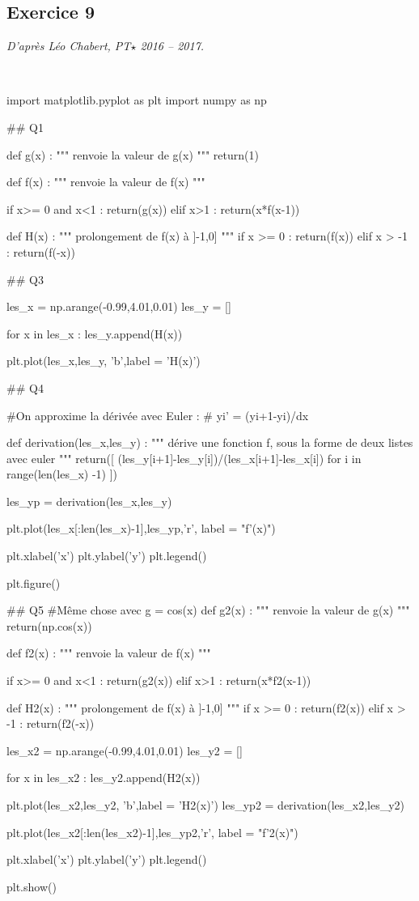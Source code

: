\documentclass[10pt,fleqn]{article} %
\begin{document}
\subsection*{Exercice 9}
\textit{D'après Léo Chabert, PT$\star$ 2016 -- 2017.}
\begin{corrige}
$\quad$
\begin{python}
import matplotlib.pyplot as plt
import numpy as np

## Q1

def g(x) :
    """ renvoie la valeur de g(x) """
    return(1)
    
def f(x) :
    """ renvoie la valeur de f(x) """
    
    if x>= 0 and x<1 :
        return(g(x))
    elif x>1 :
        return(x*f(x-1))
    
def H(x) :
    """ prolongement de f(x) à ]-1,0] """
    if x >= 0 :
        return(f(x))
    elif x > -1 :
        return(f(-x))
    
## Q3

les_x = np.arange(-0.99,4.01,0.01)
les_y = []

for x in les_x :
 les_y.append(H(x))

plt.plot(les_x,les_y, 'b',label = 'H(x)')

## Q4

#On approxime la dérivée avec Euler :
# yi' = (yi+1-yi)/dx


def derivation(les_x,les_y) :
    """ dérive une fonction f, sous la forme de deux listes avec euler """
    return([ (les_y[i+1]-les_y[i])/(les_x[i+1]-les_x[i]) for i in range(len(les_x) -1) ])

les_yp = derivation(les_x,les_y)

plt.plot(les_x[:len(les_x)-1],les_yp,'r', label = "f'(x)")

plt.xlabel('x')
plt.ylabel('y')
plt.legend()

plt.figure()

## Q5 
#Même chose avec g = cos(x)
def g2(x) :
    """ renvoie la valeur de g(x) """
    return(np.cos(x))

def f2(x) :
    """ renvoie la valeur de f(x) """
    
    if x>= 0 and x<1 :
        return(g2(x))
    elif x>1 :
        return(x*f2(x-1))
    
def H2(x) :
    """ prolongement de f(x) à ]-1,0] """
    if x >= 0 :
        return(f2(x))
    elif x > -1 :
        return(f2(-x))

les_x2 = np.arange(-0.99,4.01,0.01)
les_y2 = []

for x in les_x2 :
 les_y2.append(H2(x))

plt.plot(les_x2,les_y2, 'b',label = 'H2(x)')
les_yp2 = derivation(les_x2,les_y2)

plt.plot(les_x2[:len(les_x2)-1],les_yp2,'r', label = "f'2(x)")

plt.xlabel('x')
plt.ylabel('y')
plt.legend()

plt.show()
\end{python}
\end{corrige}
\end{document}
